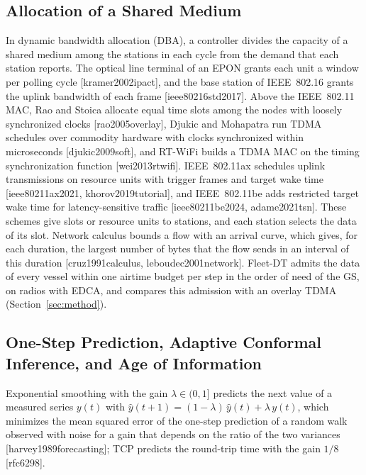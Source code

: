 \subsection{Allocation of a Shared Medium}\label{subsec:dba}
In dynamic bandwidth allocation (DBA), a controller divides the capacity of a shared medium among the stations in each cycle from the demand that each station reports. The optical line terminal of an EPON grants each unit a window per polling cycle [kramer2002ipact], and the base station of IEEE~802.16 grants the uplink bandwidth of each frame [ieee80216std2017]. Above the IEEE~802.11 MAC, Rao and Stoica allocate equal time slots among the nodes with loosely synchronized clocks [rao2005overlay], Djukic and Mohapatra run TDMA schedules over commodity hardware with clocks synchronized within microseconds [djukic2009soft], and RT-WiFi builds a TDMA MAC on the timing synchronization function [wei2013rtwifi]. IEEE~802.11ax schedules uplink transmissions on resource units with trigger frames and target wake time [ieee80211ax2021, khorov2019tutorial], and IEEE~802.11be adds restricted target wake time for latency-sensitive traffic [ieee80211be2024, adame2021tsn]. These schemes give slots or resource units to stations, and each station selects the data of its slot. Network calculus bounds a flow with an arrival curve, which gives, for each duration, the largest number of bytes that the flow sends in an interval of this duration [cruz1991calculus, leboudec2001network]. Fleet-DT admits the data of every vessel within one airtime budget per step in the order of need of the GS, on radios with EDCA, and compares this admission with an overlay TDMA (Section~\ref{sec:method}).

\subsection{One-Step Prediction, Adaptive Conformal Inference, and Age of Information}\label{subsec:aci}
Exponential smoothing with the gain $\lambda \in (0, 1]$ predicts the next value of a measured series $y(t)$ with $\hat{y}(t+1) = (1 - \lambda)\,\hat{y}(t) + \lambda\, y(t)$, which minimizes the mean squared error of the one-step prediction of a random walk observed with noise for a gain that depends on the ratio of the two variances [harvey1989forecasting]; TCP predicts the round-trip time with the gain $1/8$ [rfc6298].

